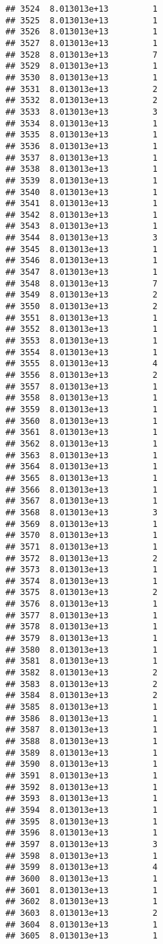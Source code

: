 \documentclass[
]{article}
\begin{document}
\begin{verbatim}
## 3524  8.013013e+13         1
## 3525  8.013013e+13         1
## 3526  8.013013e+13         1
## 3527  8.013013e+13         1
## 3528  8.013013e+13         7
## 3529  8.013013e+13         1
## 3530  8.013013e+13         1
## 3531  8.013013e+13         2
## 3532  8.013013e+13         2
## 3533  8.013013e+13         3
## 3534  8.013013e+13         1
## 3535  8.013013e+13         1
## 3536  8.013013e+13         1
## 3537  8.013013e+13         1
## 3538  8.013013e+13         1
## 3539  8.013013e+13         1
## 3540  8.013013e+13         1
## 3541  8.013013e+13         1
## 3542  8.013013e+13         1
## 3543  8.013013e+13         1
## 3544  8.013013e+13         3
## 3545  8.013013e+13         1
## 3546  8.013013e+13         1
## 3547  8.013013e+13         1
## 3548  8.013013e+13         7
## 3549  8.013013e+13         2
## 3550  8.013013e+13         2
## 3551  8.013013e+13         1
## 3552  8.013013e+13         1
## 3553  8.013013e+13         1
## 3554  8.013013e+13         1
## 3555  8.013013e+13         4
## 3556  8.013013e+13         2
## 3557  8.013013e+13         1
## 3558  8.013013e+13         1
## 3559  8.013013e+13         1
## 3560  8.013013e+13         1
## 3561  8.013013e+13         1
## 3562  8.013013e+13         1
## 3563  8.013013e+13         1
## 3564  8.013013e+13         1
## 3565  8.013013e+13         1
## 3566  8.013013e+13         1
## 3567  8.013013e+13         1
## 3568  8.013013e+13         3
## 3569  8.013013e+13         1
## 3570  8.013013e+13         1
## 3571  8.013013e+13         1
## 3572  8.013013e+13         2
## 3573  8.013013e+13         1
## 3574  8.013013e+13         1
## 3575  8.013013e+13         2
## 3576  8.013013e+13         1
## 3577  8.013013e+13         1
## 3578  8.013013e+13         1
## 3579  8.013013e+13         1
## 3580  8.013013e+13         1
## 3581  8.013013e+13         1
## 3582  8.013013e+13         2
## 3583  8.013013e+13         2
## 3584  8.013013e+13         2
## 3585  8.013013e+13         1
## 3586  8.013013e+13         1
## 3587  8.013013e+13         1
## 3588  8.013013e+13         1
## 3589  8.013013e+13         1
## 3590  8.013013e+13         1
## 3591  8.013013e+13         1
## 3592  8.013013e+13         1
## 3593  8.013013e+13         1
## 3594  8.013013e+13         1
## 3595  8.013013e+13         1
## 3596  8.013013e+13         1
## 3597  8.013013e+13         3
## 3598  8.013013e+13         1
## 3599  8.013013e+13         4
## 3600  8.013013e+13         1
## 3601  8.013013e+13         1
## 3602  8.013013e+13         1
## 3603  8.013013e+13         2
## 3604  8.013013e+13         1
## 3605  8.013013e+13         1

\end{verbatim}
\end{document}
